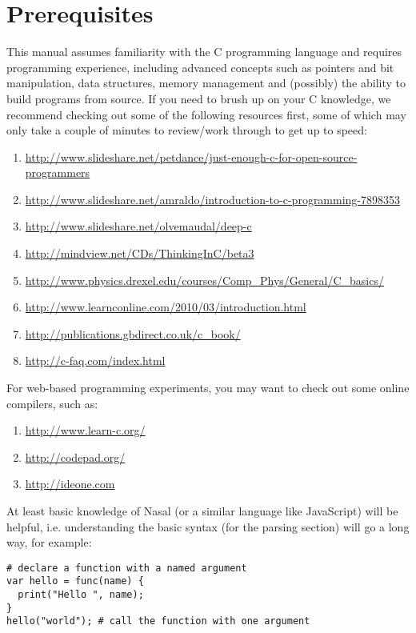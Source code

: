 \documentclass{article}
\begin{document}
\section*{Prerequisites}
\hypertarget{section:Prerequisites}{}%
This manual assumes familiarity with the C programming language and requires programming experience, including advanced concepts such as pointers and bit manipulation, data structures, memory management and (possibly) the ability to build programs from source. If you need to brush up on your C knowledge, we recommend checking out some of the following resources first, some of which may only take a couple of minutes to review/work through to get up to speed:

\begin{enumerate}
  \item \url{http://www.slideshare.net/petdance/just-enough-c-for-open-source-programmers}
  \item \url{http://www.slideshare.net/amraldo/introduction-to-c-programming-7898353}
  \item \url{http://www.slideshare.net/olvemaudal/deep-c}
  \item \url{http://mindview.net/CDs/ThinkingInC/beta3}
  \item \url{http://www.physics.drexel.edu/courses/Comp_Phys/General/C_basics/}
  \item \url{http://www.learnconline.com/2010/03/introduction.html}
  \item \url{http://publications.gbdirect.co.uk/c_book/}
  \item \url{http://c-faq.com/index.html}
\end{enumerate}


For web-based programming experiments, you may want to check out some online compilers, such as: 

\begin{enumerate}
 \item \url{http://www.learn-c.org/}
 \item \url{http://codepad.org/}
 \item \url{http://ideone.com}
\end{enumerate}

At least basic knowledge of Nasal (or a similar language like JavaScript) will be helpful, i.e. understanding the basic syntax (for the parsing section) will go a long way, for example:
\begin{lstlisting}[language=nasal]
# declare a function with a named argument
var hello = func(name) {
  print("Hello ", name);
}
hello("world"); # call the function with one argument
\end{lstlisting}
\end{document}
